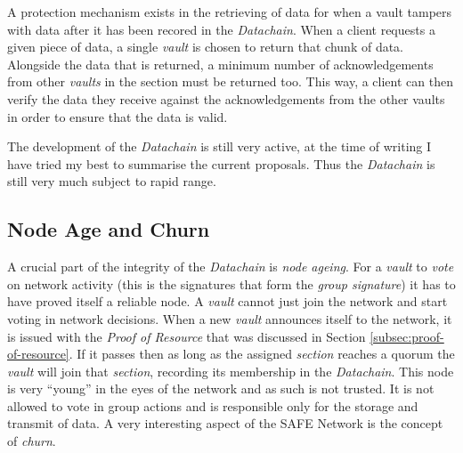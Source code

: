 A protection mechanism exists in the retrieving of data for when a vault tampers with data after it has been recored in the \textit{Datachain}. When a client requests a given piece of data, a single \textit{vault} is chosen to return that chunk of data. Alongside the data that is returned, a minimum number of acknowledgements from other \textit{vaults} in the section must be returned too. This way, a client can then verify the data they receive against the acknowledgements from the other vaults in order to ensure that the data is valid.

The development of the \textit{Datachain} is still very active, at the time of writing I have tried my best to summarise the current proposals. Thus the \textit{Datachain} is still very much subject to rapid range.

\subsection{Node Age and Churn}

A crucial part of the integrity of the \textit{Datachain} is \textit{node ageing}. For a \textit{vault} to \textit{vote} on network activity (this is the signatures that form the \textit{group signature}) it has to have proved itself a reliable node. A \textit{vault} cannot just join the network and start voting in network decisions. When a new \textit{vault} announces itself to the network, it is issued with the \textit{Proof of Resource} that was discussed in Section \ref{subsec:proof-of-resource}. If it passes then as long as the assigned \textit{section} reaches a quorum the \textit{vault} will join that \textit{section}, recording its membership in the \textit{Datachain}. This node is very ``young'' in the eyes of the network and as such is not trusted. It is not allowed to vote in group actions and is responsible only for the storage and transmit of data. A very interesting aspect of the SAFE Network is the concept of \textit{churn}. 

